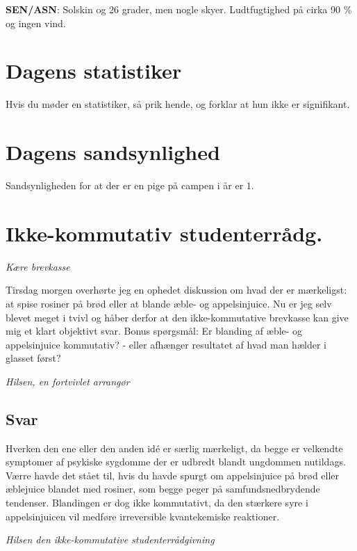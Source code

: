 \begin{minipage}[b]{0.95\linewidth}
\begin{minipage}[t]{0.47\textwidth}
\textbf{SEN/ASN}: Solskin og 26 grader, men nogle skyer. Ludtfugtighed på cirka 90 \% og ingen vind.

\vspace{-2mm}
\section*{Dagens statistiker}
Hvis du møder en statistiker, så prik hende, og forklar at hun ikke er signifikant.

\vspace{-4mm}
\section*{Dagens sandsynlighed}
Sandsynligheden for at der er en pige på campen i år er $1$.

\vspace{-4mm}
\section*{Ikke-kommutativ studenterrådg.}
\emph{Kære brevkasse}

Tirsdag morgen overhørte jeg en ophedet diskussion om hvad der er mærkeligst: at spise rosiner på brød eller at blande æble- og appelsinjuice. Nu er jeg selv blevet meget i tvivl og håber derfor at den ikke-kommutative brevkasse kan give mig et klart objektivt svar. Bonus spørgsmål: Er blanding af æble- og appelsinjuice kommutativ? - eller afhænger resultatet af hvad man hælder i glasset først?
 
\emph{Hilsen, en fortvivlet arrangør}

\subsection*{Svar}
Hverken den ene eller den anden idé er særlig mærkeligt, da begge er velkendte symptomer af psykiske sygdomme der er udbredt blandt ungdommen nutildags. Værre havde det stået til, hvis du havde spurgt om appelsinjuice på brød eller æblejuice blandet med rosiner, som begge peger på samfundsnedbrydende tendenser. Blandingen er dog ikke kommutativt, da den stærkere syre i appelsinjuicen vil medføre irreversible kvantekemiske reaktioner.

{\flushright\emph{Hilsen den ikke-kommutative studenterrådgivning}}


\end{minipage}
\end{minipage}
